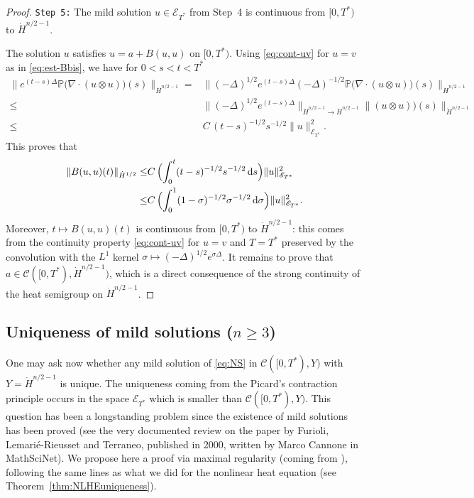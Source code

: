 \documentclass[a4paper, 12pt]{article}
\theoremstyle{plain}
\theoremstyle{definition}
\theoremstyle{remark}
\numberwithin{equation}{section}
\begin{document}
\begin{proof}
\medskip

\noindent
{\tt Step 5:} 
The mild solution $u\in {\mathscr{E}}_{T^*}$ from Step~4 is continuous from $[0,T^*)$ 
to $\dot H^{n/2-1}$.

The solution $u$ satisfies $u=a+ B(u,u)$ on $[0,T^*)$.
Using \eqref{eq:cont-uv} for $u=v$ as in \eqref{eq:est-Bbis}, we have for $0<s<t<T^*$
%
\begin{align*}
\bigl\|e^{(t-s)\Delta}{\mathbb{P}}\bigl(\nabla\cdot(u\otimes u)\bigr)(s)\bigr\|_{\dot H^{n/2-1}}
=& \bigl\|(-\Delta)^{1/2}e^{(t-s)\Delta}(-\Delta)^{-1/2}{\mathbb{P}}\bigl(\nabla\cdot(u\otimes u)\bigr)(s)\bigr\|_{\dot H^{n/2-1}}\\
\le &\bigl\|(-\Delta)^{1/2}e^{(t-s)\Delta}\bigr\|_{\dot H^{n/2-1}\to \dot H^{n/2-1}}
\bigl\|(u\otimes u)\bigr)(s)\bigr\|_{\dot H^{n/2-1}}\\
\le &C\,(t-s)^{-1/2}s^{-1/2}\|u\|_{{\mathscr{E}}_{T^*}}^2.
\end{align*}
%
This proves that
%
\begin{align*}
\|B(u,u)(t)\|_{\dot H^{1/2}}
\le& C\,\Bigl(\int_0^t(t-s)^{-1/2}s^{-1/2}\,{\rm d}s\Bigr)\|u\|_{{\mathscr{E}}_{T^*}}^2
\\
\le& C\,\Bigl(\int_0^1(1-\sigma)^{-1/2}\sigma^{-1/2}\,{\rm d}\sigma\Bigr)\|u\|_{{\mathscr{E}}_{T^*}}^2.
\end{align*}
%
Moreover, $t\mapsto B(u,u)(t)$ is continuous from $[0,T^*)$ to $\dot H^{n/2-1}$: this
comes from the continuity property \eqref{eq:cont-uv} for $u=v$ and $T=T^*$ preserved by
the convolution with the $L^1$ kernel $\sigma\mapsto (-\Delta)^{1/2}e^{\sigma\Delta}$.
It remains to prove that $a\in{\mathscr{C}}([0,T^*),\dot H^{n/2-1})$, which is a direct consequence
of the strong continuity of the heat semigroup on $\dot H^{n/2-1}$.
\end{proof}

\subsection{Uniqueness of mild solutions ($n\ge 3$)}
\label{subsec:uniqueness}

One may ask now whether any mild solution of \eqref{eq:NS} in ${\mathscr{C}}([0,T^*),Y)$ with
$Y=\dot H^{n/2-1}$ is unique. The uniqueness coming from the Picard's 
contraction principle occurs in the space ${\mathscr{E}}_{T^*}$ which is smaller than
${\mathscr{C}}([0,T^*),Y)$. This question has been a longstanding problem since the
existence of mild solutions has been proved (see the very documented review on the paper by
Furioli, Lemari\'e-Rieusset and Terraneo, published in 2000,
written by Marco Cannone in MathSciNet). We propose here a proof via 
maximal regularity (coming from \cite{Mo99}), following the same lines as what we did for the nonlinear heat equation
(see Theorem~\ref{thm:NLHEuniqueness}). 
\end{document}
